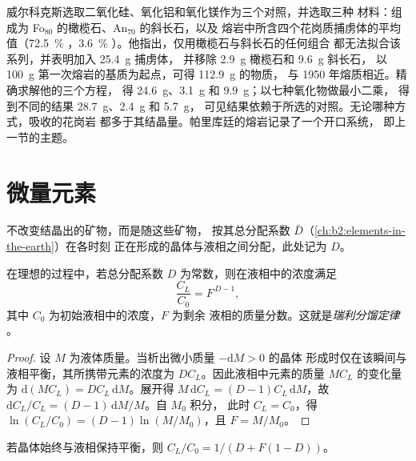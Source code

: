 威尔科克斯选取二氧化硅、氧化铝和氧化镁作为三个对照，并选取三种
材料：组成为 Fo$_{80}$ 的橄榄石、An$_{70}$ 的斜长石，以及
熔岩中所含四个花岗质捕虏体的平均值（\qty{72.5}{\percent} ，\qty{3.6}{\percent}
）。他指出，仅用橄榄石与斜长石的任何组合
都无法拟合该系列，并表明加入 \qty{25.4}{g} 捕虏体，
并移除 \qty{2.9}{g} 橄榄石和 \qty{9.6}{g} 斜长石，
以 \qty{100}{g} 第一次熔岩的基质为起点，可得 \qty{112.9}{g} 的物质，
与 1950 年熔质相近。精确求解他的三个方程，
得 \qty{24.6}{g}、\qty{3.1}{g} 和 \qty{9.9}{g}；以七种氧化物做最小二乘，
得到不同的结果 \qty{28.7}{g}、\qty{2.4}{g} 和 \qty{5.7}{g}，
可见结果依赖于所选的对照。无论哪种方式，吸收的花岗岩
都多于其结晶量。帕里库廷的熔岩记录了一个开口系统，
即上一节的主题。

\section{微量元素}\label{sec:b2:magmatic-differentiation:trace}

不改变结晶出的矿物，而是随这些矿物，
按其总分配系数 $\bar D$（\cref{ch:b2:elements-in-the-earth}）在各时刻
正在形成的晶体与液相之间分配，此处记为 $D$。

\begin{theorem}[瑞利分馏定律]\label{thm:b2:magmatic-differentiation:rayleigh}
在理想的过程中，若总分配系数
$D$ 为常数，则在液相中的浓度满足
\[
\frac{C_L}{C_0} = F^{\,D-1},
\]
其中 $C_0$ 为初始液相中的浓度，$F$ 为剩余
液相的质量分数。这就是\emph{瑞利分馏定律}
。
\end{theorem}

\begin{proof}
设 $M$ 为液体质量。当析出微小质量 $-\mathrm dM > 0$ 的晶体
形成时仅在该瞬间与液相平衡，其所携带元素的浓度为
$DC_L$。因此液相中元素的质量 $MC_L$ 的变化量为
$\mathrm d(MC_L) = DC_L\,\mathrm dM$。展开得 $M\,\mathrm dC_L = (D-1)C_L\,
\mathrm dM$，故 $\mathrm dC_L/C_L = (D-1)\,\mathrm dM/M$。自 $M_0$ 积分，
此时 $C_L = C_0$，得 $\ln(C_L/C_0) = (D-1)\ln(M/M_0)$，且 $F = M/M_0$。
\end{proof}

\begin{proposition}[微量元素的平衡结晶]
\label{prop:b2:magmatic-differentiation:equilibrium}
若晶体始终与液相保持平衡，则 $C_L/C_0 = 1/(D + F(1-D))$。
\end{proposition}

